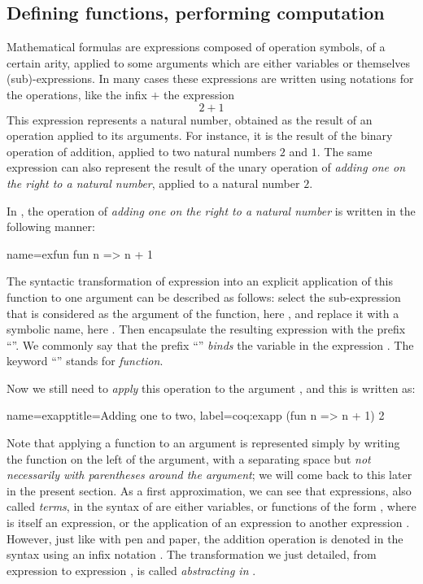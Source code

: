\subsection{Defining functions, performing computation}\label{ssec:deffun}
Mathematical formulas are expressions composed of operation symbols,
of a certain arity, applied to some arguments which are
either variables or themselves (sub)-expressions.
In many cases these
expressions are written using notations for the operations, like the
infix $+$ the expression
\[ 2 + 1 \]
This expression represents a natural number, obtained as the result of
an operation applied to its arguments. For instance, it is the result
of the binary operation of addition, applied to two natural numbers
$2$ and $1$. The same expression can also represent the result of the
unary operation of {\em adding one on the right to a natural number},
applied to a natural number $2$.

In \Coq{}, the operation of {\em adding one on the right to a natural number} is
written in the following manner:

\begin{coq}{name=exfun}{}
  fun n => n + 1
\end{coq}
The syntactic transformation of expression  into an
explicit application of this function to one argument can be
described as follows: select the sub-expression that is considered as
the argument of the function, here , and replace it with a
symbolic name, here . Then encapsulate the resulting expression
 with the prefix ``''. We commonly
say that the prefix ``'' \emph{binds} the variable  in the
expression . The keyword ``'' stands for
\emph{function}.

Now we still need to \emph{apply} this operation to the argument
, and this is written as:

\begin{coq}{name=exapp}{title=Adding one to two, label=coq:exapp}
  (fun n => n + 1) 2
\end{coq}
Note that applying a function to an argument is represented
simply by writing the function on the left of the argument,
with a separating space but {\em not
  necessarily with parentheses around the argument}; we will come back to this
later in the present section. As a first approximation, we can see
that expressions, also called \emph{terms}, in the syntax of \Coq{}
are either variables, or
functions of the form , where  is itself an
expression, or the application  of an expression  to
another expression . However, just like with pen and paper, the addition
operation is denoted in the \Coq{} syntax using an infix notation \C{+}.
The transformation we just detailed, from expression  to expression
, is called \emph{abstracting  in  }.

